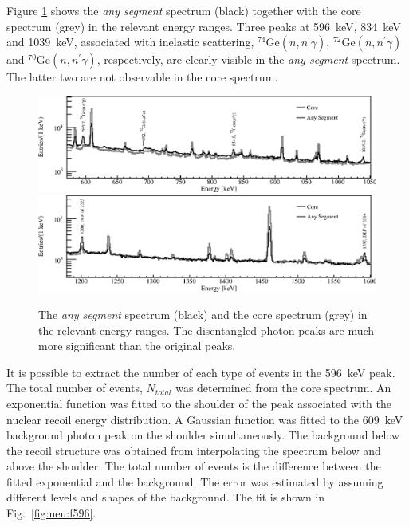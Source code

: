 Figure \ref{fig:neu:cas} shows the \emph{any segment} spectrum (black)
together with the core spectrum (grey) in the relevant energy
ranges. Three peaks at 596~keV, 834~keV and 1039~keV, associated with
inelastic scattering, $^{74}$Ge$(n, n^\prime\gamma)$, $^{72}$Ge$(n,
n^\prime\gamma)$ and $^{70}$Ge$(n, n^\prime\gamma)$, respectively, are
clearly visible in the \emph{any segment} spectrum. The latter two are
not observable in the core spectrum.

\begin{figure}[tbhp]
\centering
\includegraphics[width=\textwidth,clip]{spe_casp}
\includegraphics[width=\textwidth,clip]{spe_cas2p}
\caption{The \emph{any segment} spectrum (black) and the core spectrum
(grey) in the relevant energy ranges. The disentangled photon peaks
are much more significant than the original peaks.}
\label{fig:neu:cas}
\end{figure}

It is possible to extract the number of each type of events in the
596~keV peak. The total number of events, $N_{total}$ was determined
from the core spectrum. An exponential function was fitted to the
shoulder of the peak associated with the nuclear recoil energy
distribution. A Gaussian function was fitted to the 609~keV background
photon peak on the shoulder simultaneously. The background below the
recoil structure was obtained from interpolating the spectrum below
and above the shoulder. The total number of events is the difference
between the fitted exponential and the background. The error was
estimated by assuming different levels and shapes of the
background. The fit is shown in Fig.~\ref{fig:neu:f596}.

